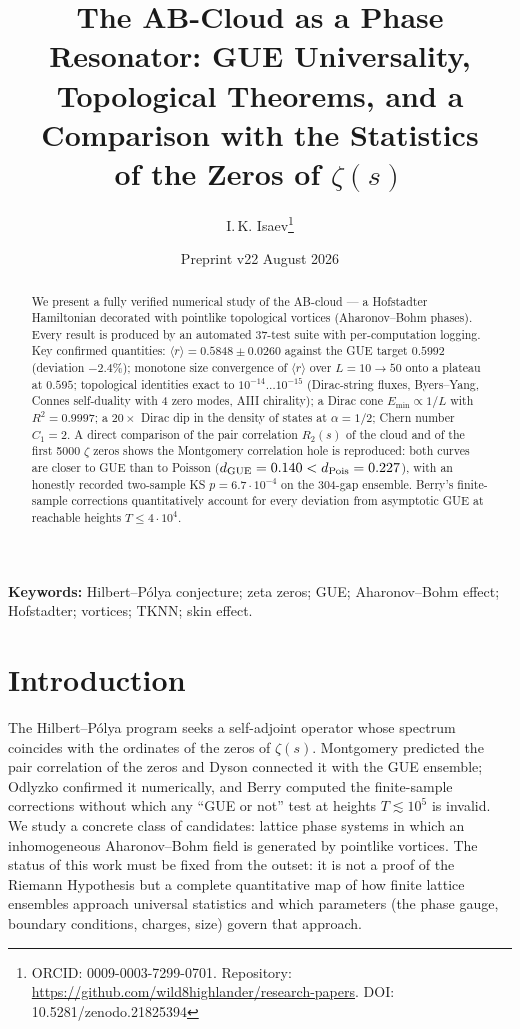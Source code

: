 \documentclass[11pt,a4paper]{article}
\title{\bfseries The AB-Cloud as a Phase Resonator: GUE Universality, \\ Topological Theorems, and a Comparison with the Statistics \\ of the Zeros of $\zeta(s)$}
\author{I.\,K. Isaev\thanks{ORCID: 0009-0003-7299-0701. Repository: \url{https://github.com/wild8highlander/research-papers}. DOI: 10.5281/zenodo.21825394}}
\date{Preprint v22 \textperiodcentered{} August 2026}
\begin{document}
\maketitle

\begin{abstract}
We present a fully verified numerical study of the AB-cloud --- a Hofstadter Hamiltonian decorated with pointlike topological vortices (Aharonov--Bohm phases). Every result is produced by an automated 37-test suite with per-computation logging. Key confirmed quantities: $\langle r\rangle = 0.5848\pm0.0260$ against the GUE target $0.5992$ (deviation $-2.4\%$); monotone size convergence of $\langle r\rangle$ over $L=10\to50$ onto a plateau at $0.595$; topological identities exact to $10^{-14}\dots10^{-15}$ (Dirac-string fluxes, Byers--Yang, Connes self-duality with 4 zero modes, AIII chirality); a Dirac cone $E_{\min}\propto1/L$ with $R^2=0.9997$; a $20\times$ Dirac dip in the density of states at $\alpha=1/2$; Chern number $C_1=2$. A direct comparison of the pair correlation $R_2(s)$ of the cloud and of the first 5000 $\zeta$ zeros shows the Montgomery correlation hole is reproduced: both curves are closer to GUE than to Poisson ($d_{\rm GUE}=0.140 < d_{\rm Pois}=0.227$), with an honestly recorded two-sample KS $p=6.7\cdot10^{-4}$ on the 304-gap ensemble. Berry's finite-sample corrections quantitatively account for every deviation from asymptotic GUE at reachable heights $T\le4\cdot10^4$.
\end{abstract}

\noindent\textbf{Keywords:} Hilbert--P\'olya conjecture; zeta zeros; GUE; Aharonov--Bohm effect; Hofstadter; vortices; TKNN; skin effect.

\section{Introduction}
The Hilbert--P\'olya program seeks a self-adjoint operator whose spectrum coincides with the ordinates of the zeros of $\zeta(s)$. Montgomery \cite{montgomery} predicted the pair correlation of the zeros and Dyson connected it with the GUE ensemble; Odlyzko \cite{odlyzko} confirmed it numerically, and Berry \cite{berry} computed the finite-sample corrections without which any ``GUE or not'' test at heights $T\lesssim10^5$ is invalid. We study a concrete class of candidates: lattice phase systems in which an inhomogeneous Aharonov--Bohm field is generated by pointlike vortices. The status of this work must be fixed from the outset: it is not a proof of the Riemann Hypothesis but a complete quantitative map of how finite lattice ensembles approach universal statistics and which parameters (the phase gauge, boundary conditions, charges, size) govern that approach.
\end{document}
